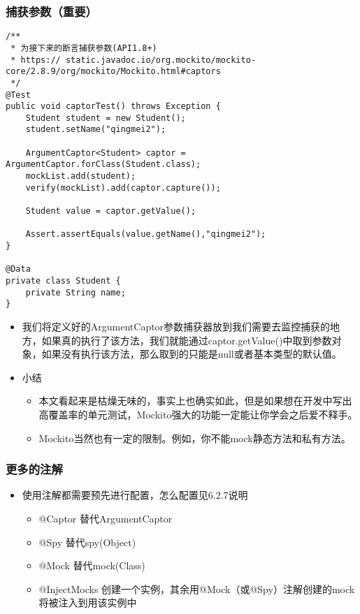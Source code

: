 \documentclass[9pt, b5paper]{article}
\begin{document}
\subsubsection{捕获参数（重要）}
\label{sec-1-1-16}
\begin{verbatim}
/**
 * 为接下来的断言捕获参数(API1.8+)
 * https:// static.javadoc.io/org.mockito/mockito-core/2.8.9/org/mockito/Mockito.html#captors
 */
@Test
public void captorTest() throws Exception {
    Student student = new Student();
    student.setName("qingmei2");

    ArgumentCaptor<Student> captor = ArgumentCaptor.forClass(Student.class);
    mockList.add(student);
    verify(mockList).add(captor.capture());

    Student value = captor.getValue();

    Assert.assertEquals(value.getName(),"qingmei2");
}

@Data
private class Student {
    private String name;
}
\end{verbatim}
\begin{itemize}
\item 我们将定义好的ArgumentCaptor参数捕获器放到我们需要去监控捕获的地方，如果真的执行了该方法，我们就能通过captor.getValue()中取到参数对象，如果没有执行该方法，那么取到的只能是null或者基本类型的默认值。
\item 小结
\begin{itemize}
\item 本文看起来是枯燥无味的，事实上也确实如此，但是如果想在开发中写出高覆盖率的单元测试，Mockito强大的功能一定能让你学会之后爱不释手。
\item Mockito当然也有一定的限制。例如，你不能mock静态方法和私有方法。
\end{itemize}
\end{itemize}
\subsubsection{更多的注解}
\label{sec-1-1-17}
\begin{itemize}
\item 使用注解都需要预先进行配置，怎么配置见6.2.7说明
\begin{itemize}
\item @Captor 替代ArgumentCaptor
\item @Spy 替代spy(Object)
\item @Mock 替代mock(Class)
\item @InjectMocks 创建一个实例，其余用@Mock（或@Spy）注解创建的mock将被注入到用该实例中
\end{itemize}
\end{itemize}
\end{document}
